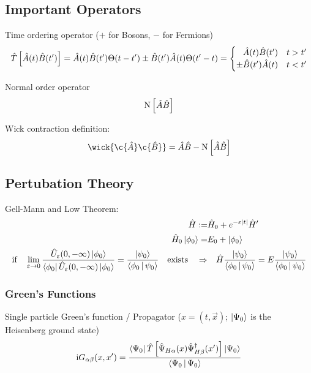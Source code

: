 	\subsection{Important Operators}
		Time ordering operator ($+$ for Bosons, $-$ for Fermions)
		\begin{equation}
			\hat{T}\left[ \hat{A}(t)\hat{B}(t') \right]
				= \hat{A}(t) \hat{B}(t') \Theta(t-t') \pm \hat{B}(t') \hat{A}(t) \Theta(t'-t)
				= \begin{cases}
					\phantom{\pm} \hat{A}(t) \hat{B}(t') & t>t' \\
					\pm \hat{B}(t') \hat{A}(t) & t<t'
				\end{cases}
		\end{equation}

		\noindent
		Normal order operator
		\begin{equation}
			\mathrm{N}\left[ \hat{A}\hat{B} \right]
		\end{equation}

		\noindent
		Wick contraction definition:
		\begin{equation}
			\wick{\c{\hat{A}} \c{\hat{B}}} = \hat{A}\hat{B} - \NormalOrder{\hat{A}\hat{B}}
		\end{equation}


	\subsection{Pertubation Theory}
		Gell-Mann and Low Theorem:
		\begin{equation}
			\begin{aligned}
				\hat{H} :=& \hat{H}_0 + e^{-\varepsilon \left| t \right|} \hat{H}' \\
				\hat{H}_0 \Ket{\phi_0} =& E_0 + \Ket{\phi_0} \\
				\text{if}\quad \lim_{\varepsilon\rightarrow 0} \frac{\hat{U}_\varepsilon(0,-\infty)\Ket{\phi_0}}{\Bra{\phi_0} \hat{U}_\varepsilon(0,-\infty)\Ket{\phi_0}}
				= \frac{\Ket{\psi_0}}{\Braket{\phi_0|\psi_0}} \quad\text{exists}\quad
				\Rightarrow&\quad \hat{H} \frac{\Ket{\psi_0}}{\Braket{\phi_0|\psi_0}} = E \frac{\Ket{\psi_0}}{\Braket{\phi_0|\psi_0}} \\
			\end{aligned}
		\end{equation}

		\subsubsection{Green's Functions}
			Single particle Green's function / Propagator  ($x=(t,\vec{x})$; $\Ket{\Psi_0}$ is the Heisenberg ground state)
			\begin{equation}
				\begin{aligned}
					\mathrm{i} G_{\alpha\beta}(x, x') &= \frac{\Bra{\Psi_0} \hat{T}\left[ \hat{\Psi}_{H\alpha}(x)\hat{\Psi}^\dagger_{H\beta}(x') \right] \Ket{\Psi_0}}{\Braket{\Psi_0|\Psi_0}} \\					
				\end{aligned}
			\end{equation}

